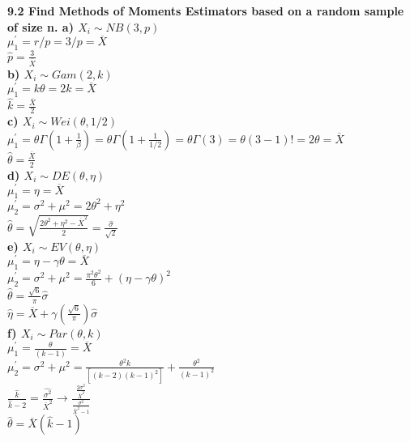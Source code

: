 
\bf{9.2} Find Methods of Moments Estimators based on a random sample of size n.
\noindent a) ${ X }_{ i }\sim NB(3,p)$\\
${ \mu  }_{ 1 }^{ ' }= r/p = 3/p = \overline { X } $\\
$\hat { p } = \frac{3}{\overline { X }}$\\
\noindent b) ${ X }_{ i }\sim Gam(2,k)$\\
${ \mu  }_{ 1 }^{ ' }= k\theta = 2k = \overline { X } $\\
$\hat { k } = \frac{\overline { X }}{2}$\\
\noindent c) ${ X }_{ i }\sim Wei(\theta,1/2)$\\
${ \mu  }_{ 1 }^{ ' }= \theta \Gamma (1+\frac { 1 }{ \beta  } ) = \theta \Gamma (1+\frac { 1 }{ 1/2  } ) = \theta \Gamma (3) = \theta(3-1)! = 2\theta = \overline{X}  $\\
$\hat { \theta } = \frac{\overline { X }}{2}$\\
\noindent d) ${ X }_{ i }\sim DE(\theta,\eta)$\\
${ \mu  }_{ 1 }^{ ' }= \eta = \overline{X}  $\\
${ \mu  }_{ 2 }^{ ' }= \sigma^{2}+\mu^{2} = 2\theta^{2}+\eta^{2}$\\
$ \hat{\theta}= \sqrt{\frac{2\theta^{2}+\eta^{2}-\overline{X}^{2}}{2}}=\frac{\hat{\sigma}}{\sqrt{2}}$\\
\noindent e) ${ X }_{ i }\sim EV(\theta,\eta)$\\
${ \mu  }_{ 1 }^{ ' }= \eta - \gamma \theta = \overline{X}  $\\
${ \mu  }_{ 2 }^{ ' }= \sigma^{2}+\mu^{2} = \frac{\pi^{2}\theta^{2}}{6} + (\eta - \gamma \theta)^{2}$\\
$ \hat{\theta}= \frac{\sqrt{6}}{\pi}\hat{\sigma}$\\
$ \hat{\eta}= \overline{X}+\gamma(\frac{\sqrt{6}}{\pi})\hat{\sigma}$\\
\noindent f) ${ X }_{ i }\sim Par(\theta,k)$\\
${ \mu  }_{ 1 }^{ ' }= \frac{\theta}{(k-1)} = \overline{X}$\\
${ \mu  }_{ 2 }^{ ' }= \sigma^{2}+\mu^{2} = \frac{\theta^{2}k}{[(k-2)(k-1)^{2}]}+\frac{\theta^{2}}{(k-1)^{2}}$\\
$ \frac{\hat{k}}{\hat{k}-2}=\frac{\hat{\sigma^{2}}}{\overline{X}^{2}} \rightarrow \frac{\frac{2\sigma^{2}}{\overline{X}^{2}}}{\frac{\sigma^{2}}{\overline{X}^{2}-1}}$\\
$ \hat{\theta}=\overline{X}(\hat{k}-1)$\\